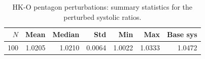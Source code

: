 \begin{table}[h]
\centering
\begin{tabular}{rrrrrrr}
\toprule
$N$ & Mean & Median & Std & Min & Max & Base sys \\
\midrule
100 & 1.0205 & 1.0210 & 0.0064 & 1.0022 & 1.0333 & 1.0472 \\
\bottomrule
\end{tabular}
\caption{HK-O pentagon perturbations: summary statistics for the perturbed systolic ratios.}
\label{tab:pentagon-perturb-stats}
\end{table}
